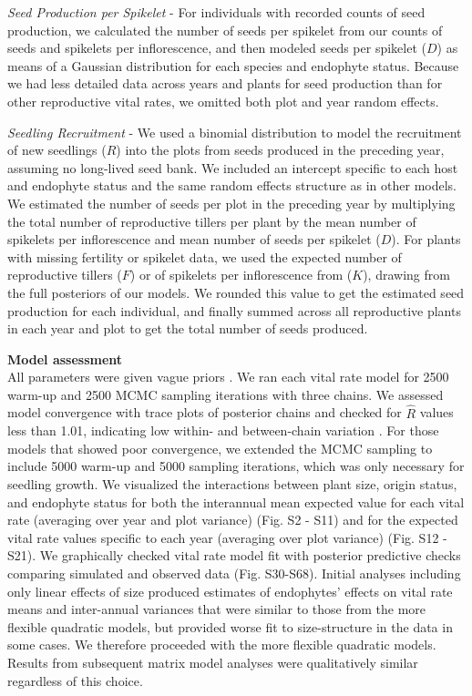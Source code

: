 \documentclass[lineno, sn-basic]{sn-jnl}%
\begin{document}
\emph{Seed Production per Spikelet} - For individuals with recorded counts of seed production, we calculated the number of seeds per spikelet from our counts of seeds and spikelets per inflorescence, and then modeled seeds per spikelet ($D$) as means of a Gaussian distribution for each species and endophyte status. 
Because we had less detailed data across years and plants for seed production than for other reproductive vital rates, we omitted both plot and year random effects. 

\emph{Seedling Recruitment} - We used a binomial distribution to model the recruitment of new seedlings ($R$) into the plots from seeds produced in the preceding year, assuming no long-lived seed bank. 
We included an intercept specific to each host and endophyte status and the same random effects structure as in other models. 
We estimated the number of seeds per plot in the preceding year by multiplying the total number of reproductive tillers per plant by the mean number of spikelets per inflorescence and mean number of seeds per spikelet ($D$).
For plants with missing fertility or spikelet data, we used the expected number of reproductive tillers ($F$) or of spikelets per inflorescence from ($K$), drawing from the full posteriors of our models. 
We rounded this value to get the estimated seed production for each individual, and finally summed across all reproductive plants in each year and plot to get the total number of seeds produced. 

\textbf{Model assessment}\\
All parameters were given vague priors \citep{gabry2019visualization}.
We ran each vital rate model for 2500 warm-up and 2500 MCMC sampling iterations with three chains. 
We assessed model convergence with trace plots of posterior chains and checked for $\hat{R}$ values less than 1.01, indicating low within- and between-chain variation \citep{brooks1998general,gelman2006data}. 
For those models that showed poor convergence, we extended the MCMC sampling to include 5000 warm-up and 5000 sampling iterations, which was only necessary for seedling growth.
We visualized the interactions between plant size, origin status, and endophyte status for both the interannual mean expected value for each vital rate (averaging over year and plot variance) (Fig. S2 - S11) and for the expected vital rate values specific to each year (averaging over plot variance) (Fig. S12 -S21).
We graphically checked vital rate model fit with posterior predictive checks comparing simulated and observed data (Fig. S30-S68).
Initial analyses including only linear effects of size produced estimates of endophytes' effects on vital rate means and inter-annual variances that were similar to those from the more flexible quadratic models, but provided worse fit to size-structure in the data in some cases. 
We therefore proceeded with the more flexible quadratic models. 
Results from subsequent matrix model analyses were qualitatively similar regardless of this choice.
\end{document}
